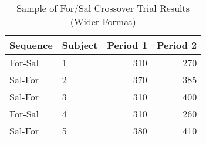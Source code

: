\begin{table}
\centering
\caption{Sample of For/Sal Crossover Trial Results (Wider Format)}
\centering
\begin{tabular}[t]{l|l|r|r}
\hline
\textbf{Sequence} & \textbf{Subject} &
\textbf{Period 1} & \textbf{Period 2}\\
\hline
For-Sal & 1 & 310 & 270\\
\hline
Sal-For & 2 & 370 & 385\\
\hline
Sal-For & 3 & 310 & 400\\
\hline
For-Sal & 4 & 310 & 260\\
\hline
Sal-For & 5 & 380 & 410\\
\hline
\end{tabular}
\label{crossoverDataWide}
\end{table}
